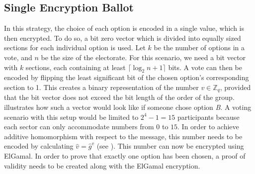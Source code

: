 \documentclass[numbers=noenddot, abstract=on, a4paper, headsepline,
footsepline, oneside, openright, draft=off, listof=leveldown]{scrreprt}
\newcommand{\myref}[1]{(see \Vref{#1})}
\begin{document}

\subsection{Single Encryption Ballot}
\label{sec:singleencryptionballot}
In this strategy, the choice of each option is encoded in a single value, which
is then encrypted. To do so, a bit zero vector which is divided
into equally sized sections for each individual option is used. Let $k$ be the
number of options in a vote, and $n$ be the size of the electorate. For this scenario, we need a bit
vector with $k$ sections, each containing at least $\lceil\log_2 n+1\rceil$
bits.
A vote can then be encoded by flipping the least significant bit of the
chosen option's corresponding section to 1. This creates a binary representation
of the number $v \in \mathbb{Z}_q$, provided that the bit
vector does not exceed the bit length of the order of the group.
 illustrates how such a vector would look
like if someone chose option \emph{B}. A voting scenario with this setup would be
limited to $2^4-1=15$ participants because each sector can only accommodate
numbers from $0$ to $15$. In order to achieve additive homomorphism with respect
to the message, this number needs to be encoded by calculating $\hat{v}=\hat{g}^{v}$ \myref{sec:expelgamal}.
This number can now be encrypted using ElGamal. In order to prove that exactly one
option has been chosen, a proof of validity needs to be created along with the
ElGamal encryption.
\end{document}
